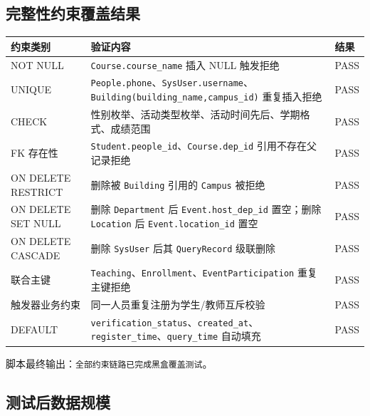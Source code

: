 \documentclass[11pt, a4paper]{article}
\begin{document}
\subsection{完整性约束覆盖结果}

\begin{longtable}{>{\raggedright\arraybackslash}p{3.2cm} >{\raggedright\arraybackslash}p{8.2cm} >{\raggedright\arraybackslash}p{3.0cm}}
\toprule
\textbf{约束类别} & \textbf{验证内容} & \textbf{结果} \\
\midrule
\endhead
NOT NULL & \texttt{Course.course\_name} 插入 NULL 触发拒绝 & PASS \\
UNIQUE & \texttt{People.phone}、\texttt{SysUser.username}、\texttt{Building(building\_name,campus\_id)} 重复插入拒绝 & PASS \\
CHECK & 性别枚举、活动类型枚举、活动时间先后、学期格式、成绩范围 & PASS \\
FK 存在性 & \texttt{Student.people\_id}、\texttt{Course.dep\_id} 引用不存在父记录拒绝 & PASS \\
ON DELETE RESTRICT & 删除被 \texttt{Building} 引用的 \texttt{Campus} 被拒绝 & PASS \\
ON DELETE SET NULL & 删除 \texttt{Department} 后 \texttt{Event.host\_dep\_id} 置空；删除 \texttt{Location} 后 \texttt{Event.location\_id} 置空 & PASS \\
ON DELETE CASCADE & 删除 \texttt{SysUser} 后其 \texttt{QueryRecord} 级联删除 & PASS \\
联合主键 & \texttt{Teaching}、\texttt{Enrollment}、\texttt{EventParticipation} 重复主键拒绝 & PASS \\
触发器业务约束 & 同一人员重复注册为学生/教师互斥校验 & PASS \\
DEFAULT & \texttt{verification\_status}、\texttt{created\_at}、\texttt{register\_time}、\texttt{query\_time} 自动填充 & PASS \\
\bottomrule
\end{longtable}

脚本最终输出：\texttt{全部约束链路已完成黑盒覆盖测试}。

\subsection{测试后数据规模}
\end{document}
